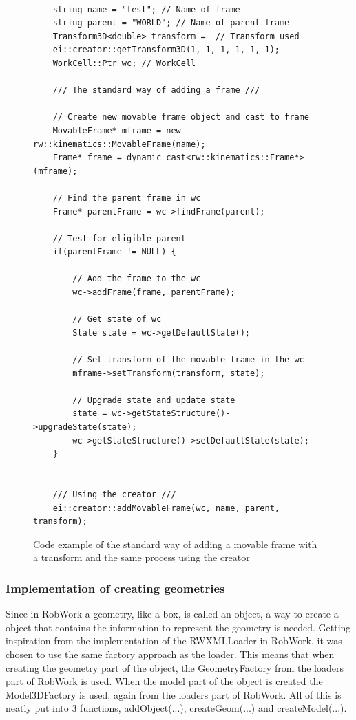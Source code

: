 \begin{figure}[h]
	\centering
	\lstset{language=C++} 
	\begin{lstlisting}[frame=single]

	string name = "test"; // Name of frame
	string parent = "WORLD"; // Name of parent frame
	Transform3D<double> transform =  // Transform used
	ei::creator::getTransform3D(1, 1, 1, 1, 1, 1);
	WorkCell::Ptr wc; // WorkCell

	/// The standard way of adding a frame ///
	
	// Create new movable frame object and cast to frame
	MovableFrame* mframe = new rw::kinematics::MovableFrame(name);
    Frame* frame = dynamic_cast<rw::kinematics::Frame*>(mframe);
    
    // Find the parent frame in wc
    Frame* parentFrame = wc->findFrame(parent);
	
	// Test for eligible parent
	if(parentFrame != NULL) {
	
		// Add the frame to the wc
        wc->addFrame(frame, parentFrame);
		
		// Get state of wc
		State state = wc->getDefaultState();
		
		// Set transform of the movable frame in the wc
		mframe->setTransform(transform, state);
		
		// Upgrade state and update state
		state = wc->getStateStructure()->upgradeState(state); 
		wc->getStateStructure()->setDefaultState(state); 
    }
	
	
	/// Using the creator ///
	ei::creator::addMovableFrame(wc, name, parent, transform);

	\end{lstlisting}
	\caption{Code example of the standard way of adding a movable frame with a transform and the same process using the creator}
	\label{fig:CodeExampleAddFrameDifference}
\end{figure}

\subsubsection{Implementation of creating geometries}
Since in RobWork a geometry, like a box, is called an object, a way to create a object that contains the information to represent the geometry is needed. Getting inspiration from the implementation of the RWXMLLoader in RobWork, it was chosen to use the same factory approach as the loader. This means that when creating the geometry part of the object, the GeometryFactory from the loaders part of RobWork is used. When the model part of the object is created the Model3DFactory is used, again from the loaders part of RobWork. All of this is neatly put into 3 functions, addObject(...), createGeom(...) and createModel(...).\\

